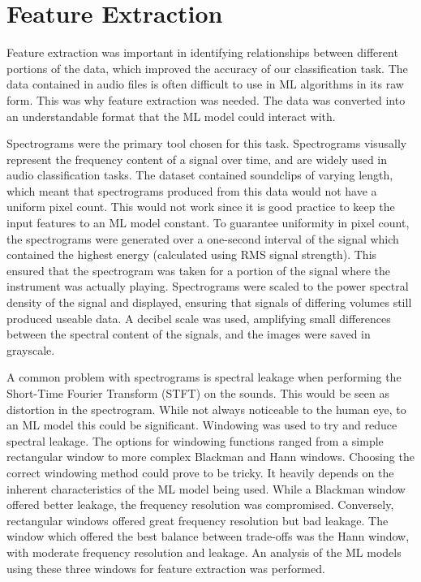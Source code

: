 \documentclass[class=report,11pt,crop=false]{standalone}
\begin{document}
\ifstandalone
\tableofcontents
\fi
\section{Feature Extraction \label{ch:Feature_Extraction}}

Feature extraction was important in identifying relationships between different portions of the data, which improved the accuracy of our classification task. The data contained in audio files is often difficult to use in ML algorithms in its raw form. This was why feature extraction was needed. The data was converted into an understandable format that the ML model could interact with. 

Spectrograms were the primary tool chosen for this task. Spectrograms visusally represent the frequency content of a signal over time, and are widely used in audio classification tasks. The dataset contained soundclips of varying length, which meant that spectrograms produced from this data would not have a uniform pixel count. This would not work since it is good practice to keep the input features to an ML model constant. To guarantee uniformity in pixel count, the spectrograms were generated over a one-second interval of the signal which contained the highest energy (calculated using RMS signal strength). This ensured that the spectrogram was taken for a portion of the signal where the instrument was actually playing. Spectrograms were scaled to the power spectral density of the signal and displayed, ensuring that signals of differing volumes still produced useable data. A decibel scale was used, amplifying small differences between the spectral content of the signals, and the images were saved in grayscale.

A common problem with spectrograms is spectral leakage when performing the Short-Time Fourier Transform (STFT) on the sounds. This would be seen as distortion in the spectrogram. While not always noticeable to the human eye, to an ML model this could be significant. Windowing was used to try and reduce spectral leakage. The options for windowing functions ranged from a simple rectangular window to more complex Blackman and Hann windows. Choosing the correct windowing method could prove to be tricky. It heavily depends on the inherent characteristics of the ML model being used. While a Blackman window offered better leakage, the frequency resolution was compromised. Conversely, rectangular windows offered great frequency resolution but bad leakage. The window which offered the best balance between trade-offs was the Hann window, with moderate frequency resolution and leakage. An analysis of the ML models using these three windows for feature extraction was performed.
\end{document}
